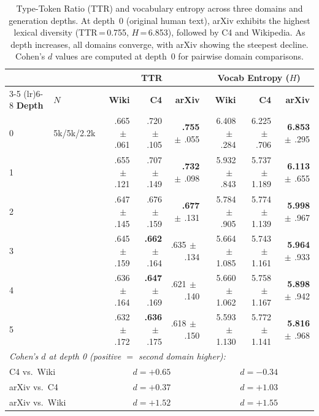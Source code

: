\newcommand{\tpm}{\ensuremath{\,\pm\,}}
\begin{table}[t]
\centering
\small
\caption{Type-Token Ratio (TTR) and vocabulary entropy across three domains and generation depths.
At depth~0 (original human text), arXiv exhibits the highest lexical diversity (TTR\,=\,0.755, $H$\,=\,6.853),
followed by C4 and Wikipedia.
As depth increases, all domains converge, with arXiv showing the steepest decline.
Cohen's $d$ values are computed at depth~0 for pairwise domain comparisons.}
\label{tab:domain-ttr-entropy}
\begin{tabular}{ll rrr rrr}
\toprule
& & \multicolumn{3}{c}{\textbf{TTR}} & \multicolumn{3}{c}{\textbf{Vocab Entropy ($H$)}} \\
\cmidrule(lr){3-5} \cmidrule(lr){6-8}
\textbf{Depth} & $N$ & \textbf{Wiki} & \textbf{C4} & \textbf{arXiv} & \textbf{Wiki} & \textbf{C4} & \textbf{arXiv} \\
\midrule
0 & 5k/5k/2.2k & .665\tpm.061 & .720\tpm.105 & \textbf{.755}\tpm.055 & 6.408\tpm.284 & 6.225\tpm.706 & \textbf{6.853}\tpm.295 \\
1 &             & .655\tpm.121 & .707\tpm.149 & \textbf{.732}\tpm.098 & 5.932\tpm.843 & 5.737\tpm1.189 & \textbf{6.113}\tpm.655 \\
2 &             & .647\tpm.145 & .676\tpm.159 & \textbf{.677}\tpm.131 & 5.784\tpm.905 & 5.774\tpm1.139 & \textbf{5.998}\tpm.967 \\
3 &             & .645\tpm.159 & \textbf{.662}\tpm.164 & .635\tpm.134 & 5.664\tpm1.085 & 5.743\tpm1.161 & \textbf{5.964}\tpm.933 \\
4 &             & .636\tpm.164 & \textbf{.647}\tpm.169 & .621\tpm.140 & 5.660\tpm1.062 & 5.758\tpm1.167 & \textbf{5.898}\tpm.942 \\
5 &             & .632\tpm.172 & \textbf{.636}\tpm.175 & .618\tpm.150 & 5.593\tpm1.130 & 5.772\tpm1.141 & \textbf{5.816}\tpm.968 \\
\midrule
\multicolumn{8}{l}{\textit{Cohen's $d$ at depth 0 (positive $=$ second domain higher):}} \\
\multicolumn{2}{l}{C4 vs.\ Wiki}   & \multicolumn{3}{c}{$d = +0.65$} & \multicolumn{3}{c}{$d = -0.34$} \\
\multicolumn{2}{l}{arXiv vs.\ C4}  & \multicolumn{3}{c}{$d = +0.37$} & \multicolumn{3}{c}{$d = +1.03$} \\
\multicolumn{2}{l}{arXiv vs.\ Wiki} & \multicolumn{3}{c}{$d = +1.52$} & \multicolumn{3}{c}{$d = +1.55$} \\
\bottomrule
\end{tabular}
\end{table}
